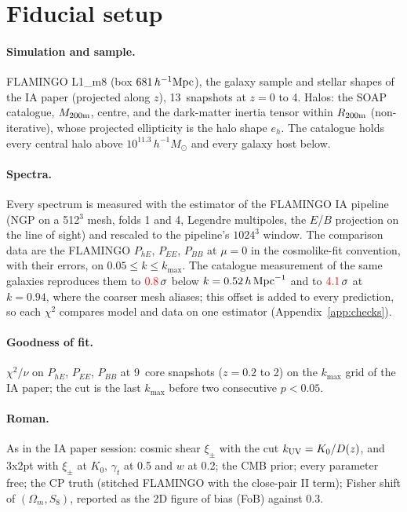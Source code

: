 \documentclass[11pt]{article}
\newcommand{\hMpc}{\,h\,{\rm Mpc}^{-1}}
\newcommand{\Msun}{\,h^{-1}M_\odot}
\newcommand{\kmax}{k_{\max}}
\newif\ifnumbersfinal
\newcommand{\refresh}[1]{\ifnumbersfinal#1\else\textcolor{red}{#1}\fi}
\newcommand{\Kmin}{0.05}        %
\newcommand{\Mcomp}{11.3}       %
\newcommand{\NGmesh}{512}           %
\newcommand{\NsnapCore}{9}      %
\newcommand{\Nsnap}{13}         %
\begin{document}
\section{Fiducial setup}

\paragraph{Simulation and sample.} FLAMINGO L1\_m8 (box $681\,h^{-1}{\rm
Mpc}$), the galaxy sample and stellar shapes of the IA paper (projected
along $z$), \Nsnap\ snapshots at $z=0$ to 4. Halos: the SOAP catalogue,
$M_{\rm 200m}$, centre, and the dark-matter inertia tensor within
$R_{\rm 200m}$ (non-iterative), whose projected ellipticity is the halo
shape $e_h$. The catalogue holds every central halo above
$10^{\Mcomp}\Msun$ and every galaxy host below.

\paragraph{Spectra.} Every spectrum is measured with the estimator of the
FLAMINGO IA pipeline (NGP on a \NGmesh$^3$ mesh, folds 1 and 4, Legendre
multipoles, the $E$/$B$ projection on the line of sight) and rescaled to
the pipeline's $1024^3$ window. The comparison data are the FLAMINGO
$P_{hE}$, $P_{EE}$, $P_{BB}$ at $\mu=0$ in the cosmolike-fit convention,
with their errors, on $\Kmin\le k\le\kmax$. The catalogue measurement of
the same galaxies reproduces them to $\refresh{\reproLow}\,\sigma$ below
$k=0.52\hMpc$ and to $\refresh{\reproHigh}\,\sigma$ at $k=0.94$, where the
coarser mesh aliases; this offset is added to every prediction, so each
$\chi^2$ compares model and data on one estimator (Appendix~\ref{app:checks}).

\paragraph{Goodness of fit.} $\chi^2/\nu$ on $P_{hE}$, $P_{EE}$, $P_{BB}$ at
\NsnapCore\ core snapshots ($z=0.2$ to 2) on the $\kmax$ grid of the IA
paper; the cut is the last $\kmax$ before two consecutive $p<0.05$.

\paragraph{Roman.} As in the IA paper session: cosmic shear $\xi_\pm$ with
the cut $k_{\rm UV}=K_0/D(z)$, and 3x2pt with $\xi_\pm$ at $K_0$, $\gamma_t$
at 0.5 and $w$ at 0.2; the CMB prior; every parameter free; the CP truth
(stitched FLAMINGO with the close-pair II term); Fisher shift of
$(\Omega_m, S_8)$, reported as the 2D figure of bias (FoB) against 0.3.
\end{document}
